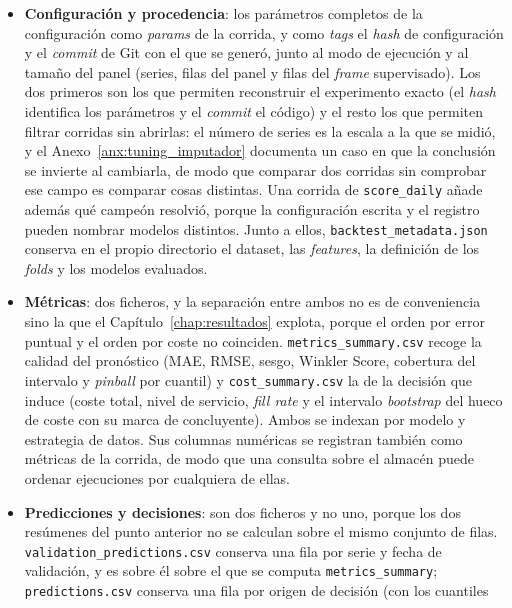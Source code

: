 \begin{itemize}
    \item \textbf{Configuración y procedencia}: los parámetros completos de la configuración
    como \textit{params} de la corrida, y como \textit{tags} el \textit{hash} de configuración
    y el \textit{commit} de Git con el que se generó, junto al modo de ejecución y al tamaño del
    panel (series, filas del panel y filas del \textit{frame} supervisado). Los dos primeros son
    los que permiten reconstruir el experimento exacto (el \textit{hash} identifica los
    parámetros y el \textit{commit} el código) y el resto los que permiten filtrar corridas sin
    abrirlas: el número de series es la escala a la que se midió, y el Anexo~\ref{anx:tuning_imputador}
    documenta un caso en que la conclusión se invierte al cambiarla, de modo que comparar dos corridas
    sin comprobar ese campo es comparar cosas distintas. Una corrida de
    \texttt{score\_daily} añade además qué campeón resolvió, porque la configuración escrita y el
    registro pueden nombrar modelos distintos. Junto a ellos, \texttt{backtest\_}\allowbreak\texttt{metadata.json}
    conserva en el propio directorio el dataset, las \textit{features}, la definición de los
    \textit{folds} y los modelos evaluados.
    \item \textbf{Métricas}: dos ficheros, y la separación entre ambos no es de conveniencia sino
    la que el Capítulo~\ref{chap:resultados} explota, porque el orden por error puntual y el
    orden por coste no coinciden. \texttt{metrics\_}\allowbreak\texttt{summary.csv} recoge la
    calidad del pronóstico (MAE, RMSE, sesgo, Winkler Score, cobertura del intervalo y
    \textit{pinball} por cuantil) y \texttt{cost\_}\allowbreak\texttt{summary.csv} la de la
    decisión que induce (coste total, nivel de servicio, \textit{fill rate} y el intervalo
    \textit{bootstrap} del hueco de coste con su marca de concluyente). Ambos se indexan por
    modelo y estrategia de datos. Sus columnas numéricas se registran también como métricas de la
    corrida, de modo que una consulta sobre el almacén puede ordenar ejecuciones por cualquiera
    de ellas.
    \item \textbf{Predicciones y decisiones}: son dos ficheros y no uno, porque los dos
    resúmenes del punto anterior no se calculan sobre el mismo conjunto de filas.
    \texttt{validation\_}\allowbreak\texttt{predictions.csv} conserva una fila por serie y fecha
    de validación, y es sobre él sobre el que se computa \texttt{metrics\_summary};
    \texttt{predictions.csv} conserva una fila por origen de decisión (con los cuantiles

\end{itemize}
